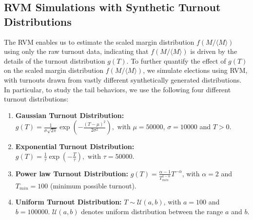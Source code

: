 \subsection{RVM Simulations with Synthetic Turnout Distributions}
The RVM enables us to estimate the scaled margin distribution $f(M / \langle M \rangle)$ using only the raw turnout data, indicating that $f(M / \langle M \rangle)$ is driven by the details of the turnout distribution $g(T)$. To further quantify the effect of $g(T)$ on the scaled margin distribution $f(M / \langle M \rangle)$, we simulate elections using RVM, with turnouts drawn from vastly different synthetically generated distributions. In particular, to study the tail behaviors, we use the following four different turnout distributions:
\begin{enumerate}
    \item \textbf{Gaussian Turnout Distribution:} $g(T) = \frac{1}{\sigma\sqrt{2\pi}}\exp\left(-\frac{(T - \mu)^2}{2\sigma^2}\right), \text{ with } \mu = 50000$, $\sigma = 10000$ and $T > 0$.
    \item \textbf{Exponential Turnout Distribution:} $g(T) = \frac{1}{\tau} \exp{\left(-\frac{T}{\tau}\right)}, \text{ with } \tau = 50000$.
    \item \textbf{Power law Turnout Distribution:} $g(T) = \frac{\alpha - 1}{T_{min} ^{1 -\alpha}} T ^ {-\alpha}$, with $\alpha = 2$ and $T_{min} = 100$ (minimum possible turnout).
    \item \textbf{Uniform Turnout Distribution:} $T \sim \mathcal{U} (a, b)$, with $a = 100$ and $b = 100000$. $\mathcal{U}(a, b)$ denotes uniform distribution between the range $a$ and $b$.
\end{enumerate}

